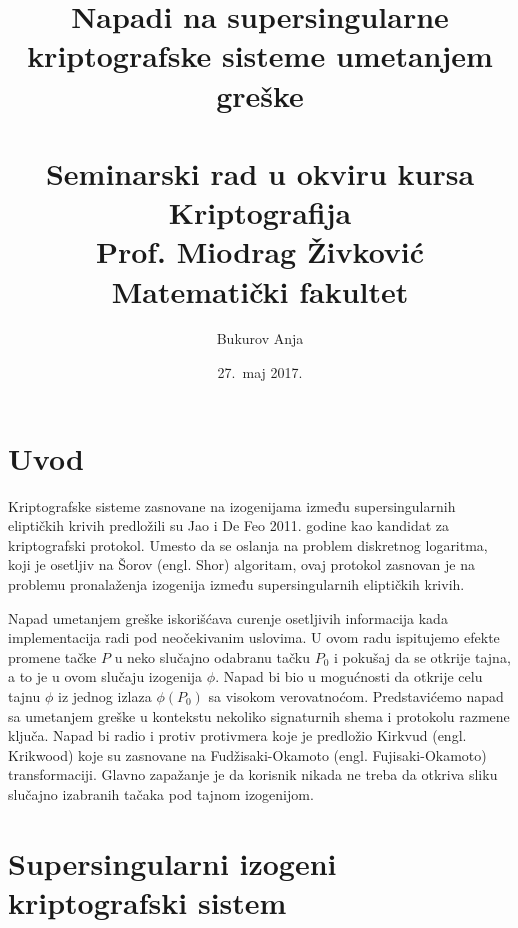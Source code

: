 \documentclass[a4paper]{article}
\begin{document}
\title{Napadi na supersingularne kriptografske sisteme umetanjem greške\\ \small{~\\Seminarski rad u okviru kursa Kriptografija\\ Prof. Miodrag Živković\\Matematički fakultet}}

\author{Bukurov Anja}
\date{27.~maj 2017.}
\maketitle



\section{Uvod}

Kriptografske sisteme zasnovane na izogenijama između supersingularnih eliptičkih krivih predložili su Jao i De Feo 2011. godine kao kandidat za kriptografski protokol. Umesto da se oslanja na problem diskretnog logaritma, koji je osetljiv na Šorov (engl. Shor) algoritam, ovaj protokol zasnovan je na problemu pronalaženja izogenija između supersingularnih eliptičkih krivih.

Napad umetanjem greške iskorišćava curenje osetljivih informacija kada implementacija radi pod neočekivanim uslovima. U ovom radu ispitujemo efekte promene tačke $P$ u neko slučajno odabranu tačku $P_0$ i pokušaj da se otkrije tajna, a to je u ovom slučaju izogenija $\phi$. Napad bi bio u mogućnosti da otkrije celu tajnu $\phi$ iz jednog izlaza $\phi(P_0)$ sa visokom verovatnoćom. Predstavićemo napad sa umetanjem greške u kontekstu nekoliko signaturnih shema i protokolu razmene ključa. Napad bi radio i protiv protivmera koje je predložio Kirkvud (engl. Krikwood) koje su zasnovane na Fudžisaki-Okamoto (engl. Fujisaki-Okamoto) transformaciji. Glavno zapažanje je da korisnik nikada ne treba da otkriva sliku slučajno izabranih tačaka pod tajnom izogenijom. 


\section{Supersingularni izogeni kriptografski sistem}
\end{document}
